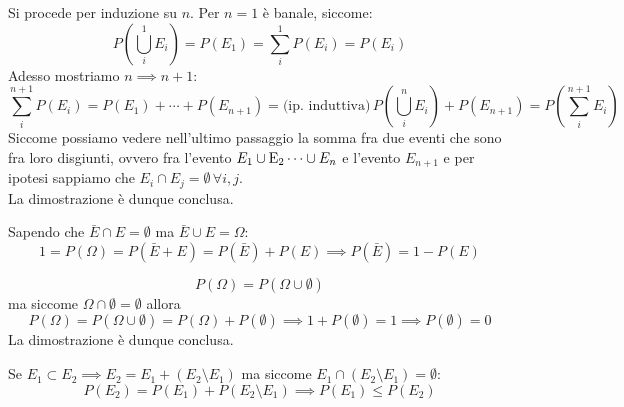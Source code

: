 \documentclass{report}
\begin{document}
	\begin{myproof}
	Si procede per induzione su $n$. Per $n = 1$ è banale, siccome:
	$$
		P \left( \bigcup_i^1 E_i \right) = P(E_1) = \sum_i^1 P(E_i) = P(E_i)
	$$
	Adesso mostriamo $n \implies n+1$:
	$$
		\sum_i^{n+1} P(E_i) = P(E_1) + \cdots + P(E_{n+1}) = \text{(ip. induttiva)} \, P \left(\bigcup_i^n E_i \right) + P(E_{n+1}) = P \left( \sum_{i}^{n+1} E_i \right)
	$$
	Siccome possiamo vedere nell'ultimo passaggio la somma fra due eventi che sono fra loro disgiunti, ovvero fra l'evento $E_1 \cup \operatorname{E}_2 \cdots \cup E_n$ e l'evento $E_{n+1}$ e per ipotesi sappiamo che $E_i \cap E_j = \emptyset \, \forall i,j$. \\
	La dimostrazione è dunque conclusa.
	\end{myproof}
	\begin{myproof}
		Sapendo che $\bar{E} \cap E = \emptyset$ ma $\bar{E} \cup E = \Omega$:
		$$ 1 = P(\Omega) = P(\bar{E} + E) = P(\bar{E}) + P(E) \implies P(\bar{E}) = 1 - P(E)$$
	\end{myproof}
	\begin{myproof}
		$$
			P(\Omega) = P(\Omega \cup \emptyset)
		$$
		ma siccome $\Omega \cap \emptyset = \emptyset$ allora
		$$
			P(\Omega) = P(\Omega \cup \emptyset) = P(\Omega) + P(\emptyset)\implies 1 + P(\emptyset) = 1 \implies P(\emptyset) = 0
		$$
		La dimostrazione è dunque conclusa.
	\end{myproof}
	\begin{myproof}
		Se $E_1 \subset E_2 \implies E_2 = E_1 + (E_2 \setminus E_1)$ ma siccome $E_1 \cap (E_2 \setminus E_1) = \emptyset$:
		$$P(E_2) = P(E_1) + P(E_2 \setminus E_1) \implies P(E_1) \leq P(E_2)$$
	\end{myproof}
\end{document}

